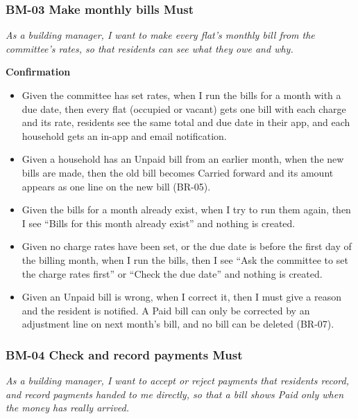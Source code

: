 \documentclass[11pt,a4paper]{report}
\begin{document}
\subsubsection*{BM-03 \textperiodcentered{} Make monthly bills \textperiodcentered{} Must}

\emph{As a building manager, I want to make every flat's monthly bill from the committee's rates, so that residents can see what they owe and why.}

\medskip\noindent\textbf{Confirmation}\par

\begin{itemize}
  \item Given the committee has set rates, when I run the bills for a month with a due date, then every flat (occupied or vacant) gets one bill with each charge and its rate, residents see the same total and due date in their app, and each household gets an in-app and email notification.
  \item Given a household has an Unpaid bill from an earlier month, when the new bills are made, then the old bill becomes Carried forward and its amount appears as one line on the new bill (BR-05).
  \item Given the bills for a month already exist, when I try to run them again, then I see ``Bills for this month already exist'' and nothing is created.
  \item Given no charge rates have been set, or the due date is before the first day of the billing month, when I run the bills, then I see ``Ask the committee to set the charge rates first'' or ``Check the due date'' and nothing is created.
  \item Given an Unpaid bill is wrong, when I correct it, then I must give a reason and the resident is notified. A Paid bill can only be corrected by an adjustment line on next month's bill, and no bill can be deleted (BR-07).
\end{itemize}

\subsubsection*{BM-04 \textperiodcentered{} Check and record payments \textperiodcentered{} Must}

\emph{As a building manager, I want to accept or reject payments that residents record, and record payments handed to me directly, so that a bill shows Paid only when the money has really arrived.}
\end{document}
